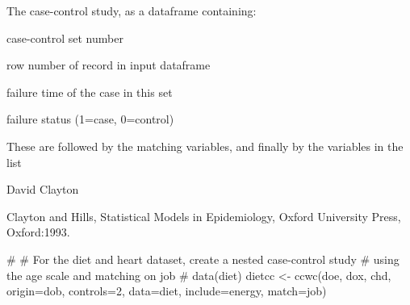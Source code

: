 \begin{Value}
The case-control study, as a  dataframe containing:
\begin{ldescription}
\item[\code{Set}] case-control set number

\item[\code{Map}] row number of record in input dataframe

\item[\code{Time}] failure time of the case in this set

\item[\code{Fail}] failure status (1=case, 0=control)

\end{ldescription}

These are followed by the matching variables, and finally by the
variables in the  list
\end{Value}
\begin{Author}\relax
David Clayton
\end{Author}
\begin{References}\relax
Clayton and Hills, Statistical Models in Epidemiology, Oxford
University Press, Oxford:1993.
\end{References}
\begin{SeeAlso}\relax
{}
\end{SeeAlso}
\begin{Examples}
\begin{ExampleCode}
#
# For the diet and heart dataset, create a nested case-control study
# using the age scale and matching on job
#
data(diet)
dietcc <- ccwc(doe, dox, chd, origin=dob, controls=2, data=diet,
               include=energy, match=job)
\end{ExampleCode}
\end{Examples}

